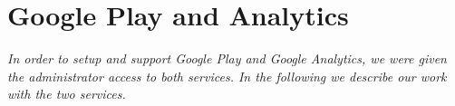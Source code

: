 \section{Google Play and Analytics} \label{Sprint1_SecGooglePlayAndAnalytics}
\textit{In order to setup and support Google Play and Google Analytics, we were given the administrator access to both services. In the following we describe our work with the two services.}


